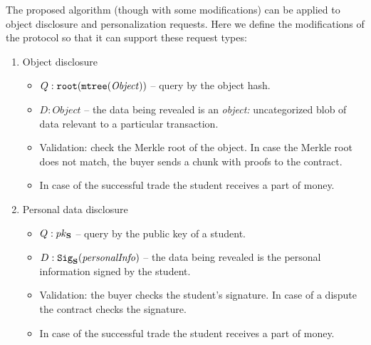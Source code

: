 The proposed algorithm (though with some modifications) can be applied to object disclosure and personalization requests. Here we define the modifications of the protocol so that it can support these request types:
\begin{enumerate}
  \item Object disclosure
    \begin{itemize}
      \item $Q: \mathtt{root}(\mathtt{mtree}(\mathit{Object}))$ -- query by the object hash.
      \item $D: \mathit{Object}$ -- the data being revealed is an \textit{object:} uncategorized blob of data relevant to a particular transaction.
      \item Validation: check the Merkle root of the object. In case the Merkle root does not match, the buyer sends a chunk with proofs to the contract.
      \item In case of the successful trade the student receives a part of money.
    \end{itemize}

  \item Personal data disclosure
    \begin{itemize}
      \item $Q: pk_{\mathbf{S}}$ -- query by the public key of a student.
      \item $D: \mathtt{Sig}_{\mathbf{S}}(\mathit{personalInfo})$ -- the data being revealed is the personal information signed by the student.
      \item Validation: the buyer checks the student's signature. In case of a dispute the contract checks the signature.
      \item In case of the successful trade the student receives a part of money.
    \end{itemize}
\end{enumerate}

